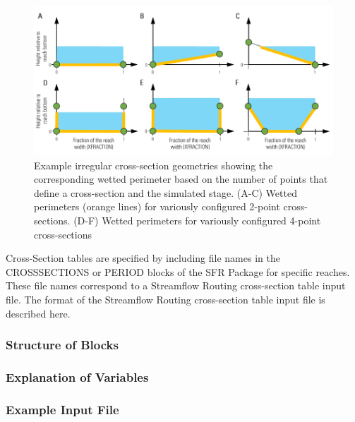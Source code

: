 \begin{figure}[ht]
	\centering
	\includegraphics[scale=1.0]{../Figures/n-point-cross-section-wetted-perimeter}
	\caption[Illustrations of variously defined n-point cross-sections that show how wetted perimeter will vary depending on the stage and the number of points used to define the cross-section]{Example irregular cross-section geometries showing the corresponding wetted perimeter based on the number of points that define a cross-section and the simulated stage.  (A-C) Wetted perimeters (orange lines) for variously configured 2-point cross-sections.  (D-F) Wetted perimeters for variously configured 4-point cross-sections}
	\label{fig:sfr-n-point-wp}
\end{figure}

Cross-Section tables are specified by including file names in the CROSSSECTIONS or PERIOD blocks of the SFR Package for specific reaches.  These file names correspond to a Streamflow Routing cross-section table input file.  The format of the Streamflow Routing cross-section table input file is described here.

\vspace{5mm}
\subsubsection{Structure of Blocks}
\vspace{5mm}



\vspace{5mm}

\vspace{5mm}
\subsubsection{Explanation of Variables}
\begin{description}

\end{description}

\subsubsection{Example Input File}


